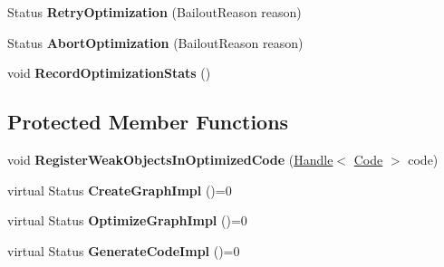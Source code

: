 \begin{DoxyCompactItemize}
\item 
Status {\bfseries Retry\+Optimization} (Bailout\+Reason reason)\hypertarget{classv8_1_1internal_1_1_compilation_job_add734850a2cfa3dc10afdfc53da26f2a}{}\label{classv8_1_1internal_1_1_compilation_job_add734850a2cfa3dc10afdfc53da26f2a}

\item 
Status {\bfseries Abort\+Optimization} (Bailout\+Reason reason)\hypertarget{classv8_1_1internal_1_1_compilation_job_acb8f0f364ab6df1aca2866e723172dd9}{}\label{classv8_1_1internal_1_1_compilation_job_acb8f0f364ab6df1aca2866e723172dd9}

\item 
void {\bfseries Record\+Optimization\+Stats} ()\hypertarget{classv8_1_1internal_1_1_compilation_job_a4834648be2daf89baea5fd8e3bd42e96}{}\label{classv8_1_1internal_1_1_compilation_job_a4834648be2daf89baea5fd8e3bd42e96}

\end{DoxyCompactItemize}
\subsection*{Protected Member Functions}
\begin{DoxyCompactItemize}
\item 
void {\bfseries Register\+Weak\+Objects\+In\+Optimized\+Code} (\hyperlink{classv8_1_1internal_1_1_handle}{Handle}$<$ \hyperlink{classv8_1_1internal_1_1_code}{Code} $>$ code)\hypertarget{classv8_1_1internal_1_1_compilation_job_aba7deda91ae9f7120430ca85cd096d57}{}\label{classv8_1_1internal_1_1_compilation_job_aba7deda91ae9f7120430ca85cd096d57}

\item 
virtual Status {\bfseries Create\+Graph\+Impl} ()=0\hypertarget{classv8_1_1internal_1_1_compilation_job_ad22862a0819a2ab215af033e70fb4223}{}\label{classv8_1_1internal_1_1_compilation_job_ad22862a0819a2ab215af033e70fb4223}

\item 
virtual Status {\bfseries Optimize\+Graph\+Impl} ()=0\hypertarget{classv8_1_1internal_1_1_compilation_job_a70018e9f5683dfe66a4c2bad1a90d5c0}{}\label{classv8_1_1internal_1_1_compilation_job_a70018e9f5683dfe66a4c2bad1a90d5c0}

\item 
virtual Status {\bfseries Generate\+Code\+Impl} ()=0\hypertarget{classv8_1_1internal_1_1_compilation_job_aa0972a258245322265dd5679ddd1807f}{}\label{classv8_1_1internal_1_1_compilation_job_aa0972a258245322265dd5679ddd1807f}

\end{DoxyCompactItemize}
